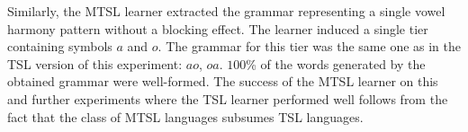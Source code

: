 Similarly, the MTSL learner extracted the grammar representing a single vowel harmony pattern without a blocking effect.
The learner induced a single tier containing symbols $a$ and $o$.
The grammar for this tier was the same one as in the TSL version of this experiment: $ao$, $oa$.
$100$\% of the words generated by the obtained grammar were well-formed.
The success of the MTSL learner on this and further experiments where the TSL learner performed well follows from the fact that the class of MTSL languages subsumes TSL languages. 


\begin{table}[h!]
\centering
{}
\caption{MTSL learning of a single harmony without blockers; abstract representation.}
\end{table}


